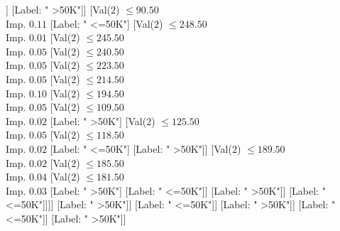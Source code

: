 \documentclass[margin=10pt]{standalone}
\begin{document}
\begin{forest}
																										[Val($2$) $ \leq 68.50$ \\ Imp. $0.01$
																											[Val($2$) $ \leq 41.50$ \\ Imp. $0.11$
																												[Val($2$) $ \leq 27.50$ \\ Imp. $0.32$
																													[Label: " >50K"]
																													[Label: " <=50K"]]
																												[Label: " >50K"]]
																											[Val($2$) $ \leq 90.50$ \\ Imp. $0.11$
																												[Label: " <=50K"]
																												[Val($2$) $ \leq 248.50$ \\ Imp. $0.01$
																													[Val($2$) $ \leq 245.50$ \\ Imp. $0.05$
																														[Val($2$) $ \leq 240.50$ \\ Imp. $0.05$
																															[Val($2$) $ \leq 223.50$ \\ Imp. $0.05$
																																[Val($2$) $ \leq 214.50$ \\ Imp. $0.10$
																																	[Val($2$) $ \leq 194.50$ \\ Imp. $0.05$
																																		[Val($2$) $ \leq 109.50$ \\ Imp. $0.02$
																																			[Label: " >50K"]
																																			[Val($2$) $ \leq 125.50$ \\ Imp. $0.05$
																																				[Val($2$) $ \leq 118.50$ \\ Imp. $0.02$
																																					[Label: " <=50K"]
																																					[Label: " >50K"]]
																																				[Val($2$) $ \leq 189.50$ \\ Imp. $0.02$
																																					[Val($2$) $ \leq 185.50$ \\ Imp. $0.04$
																																						[Val($2$) $ \leq 181.50$ \\ Imp. $0.03$
																																							[Label: " >50K"]
																																							[Label: " <=50K"]]
																																						[Label: " >50K"]]
																																					[Label: " <=50K"]]]]
																																		[Label: " >50K"]]
																																	[Label: " <=50K"]]
																																[Label: " >50K"]]
																															[Label: " <=50K"]]
																														[Label: " >50K"]]

\end{forest}
\end{document}
